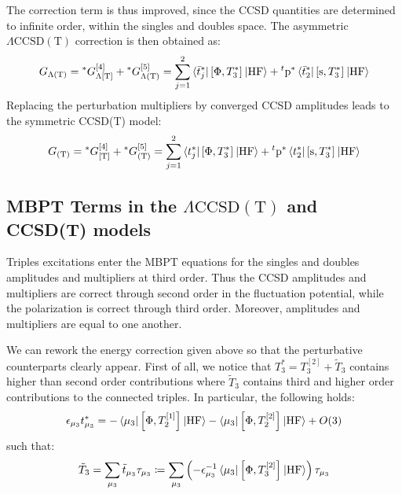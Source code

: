 The correction term is thus improved, since the \acs{CCSD} quantities
are determined to infinite order, within the singles and doubles space.
The asymmetric $\Lambda\text{CCSD}(\text{T})$ correction is then
obtained as:
\begin{equation}\label{eq:5-lambda-parens-t}
 \begin{aligned}
  G_{\Lambda(\text{T})} =
  {}^*G_{\Lambda[\text{T}]}^{[4]} +
  {}^*G_{\Lambda(\text{T})}^{[5]} =
  \sum_{j=1}^2
    \braket{\bar{t}_{j}^{*} | \left[ \Phi, T_3^{*} \right]^{} | \mathrm{HF}}
  + {}^t\mathrm{p}^{*}\braket{\bar{t}_{2}^{*} | \left[ \mathrm{s}, T_3^{*} \right]^{} | \mathrm{HF}}
 \end{aligned}
\end{equation}
Replacing the perturbation multipliers by converged \acs{CCSD}
amplitudes leads to the symmetric CCSD(T) model:
\begin{equation}\label{eq:5-parens-t}
 \begin{aligned}
  G_{(\text{T})} =
  {}^*G_{[\text{T}]}^{[4]} +
  {}^*G_{(\text{T})}^{[5]} =
  \sum_{j=1}^2
    \braket{t_{j}^{*} | \left[ \Phi, T_3^{*} \right]^{} | \mathrm{HF}}
  + {}^t\mathrm{p}^{*}\braket{t_{2}^{*} | \left[ \mathrm{s}, T_3^{*} \right]^{} | \mathrm{HF}}
 \end{aligned}
\end{equation}

\subsection{MBPT Terms in the
\texorpdfstring{$\Lambda\text{CCSD}(\text{T})$}{CCSD(aT)} and CCSD(T) models}

Triples excitations enter the \acs{MBPT} equations for the singles and
doubles amplitudes and multipliers at third order. Thus the \acs{CCSD}
amplitudes and multipliers are correct through second order in the
fluctuation potential, while the polarization is correct through third
order. Moreover, amplitudes and multipliers are equal to one another.

We can rework the energy correction given above so that the perturbative
counterparts clearly appear.
First of all, we notice that $T_3^{*} = T_3^{[2]} + \tilde{T}_3$ contains higher than second order
contributions where $\tilde{T}_3$ contains third and higher order contributions to the
connected triples. In particular, the following holds:
\begin{equation}
  \epsilon_{\mu_3}t_{\mu_3}^{*} =
  - \braket{\mu_3 |\left[ \Phi, T_2^{[1]} \right]^{} | \mathrm{HF}}
  - \braket{\mu_3 | \left[ \Phi, T_2^{[2]} \right]^{} | \mathrm{HF}}
  + O(3)
\end{equation}
such that:
\begin{equation}
  \tilde{T}_3
  = \sum_{\mu_3}\tilde{t}_{\mu_3}\tau_{\mu_3}
  \coloneq \sum_{\mu_3}
  \left(-\epsilon_{\mu_3}^{-1}\braket{\mu_3 |
  \left[ \Phi, T_3^{[2]} \right]^{}
  | \mathrm{HF}}\right)
  \tau_{\mu_3}
\end{equation}

